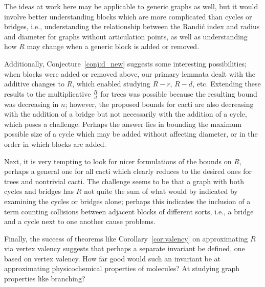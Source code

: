 \documentclass{amsart}
\theoremstyle{definition}
\begin{document}
The ideas at work here may be applicable to generic graphs as well, but it would involve better understanding blocks which are more complicated than cycles or bridges, i.e., understanding the relationship between the Randi\'c index and radius and diameter for graphs without articulation points, as well as understanding how $R$ may change when a generic block is added or removed. 

Additionally, Conjecture~\ref{conj:d_new} suggests some interesting possibilities; when blocks were added or removed above, our primary lemmata dealt with the additive changes to $R$, which enabled studying $R-r$, $R-d$, etc. Extending these results to the multiplicative $\frac{R}{d}$ for trees was possible because the resulting bound was decreasing in $n$; however, the proposed bounds for cacti are also decreasing with the addition of a bridge but not necessarily with the addition of a cycle, which poses a challenge. Perhaps the answer lies in bounding the maximum possible size of a cycle which may be added without affecting diameter, or in the order in which blocks are added.

Next, it is very tempting to look for nicer formulations of the bounds on $R$, perhaps a general one for all cacti which clearly reduces to the desired ones for trees and nontrivial cacti. The challenge seems to be that a graph with both cycles and bridges has $R$ not quite the sum of what would by indicated by examining the cycles or bridges alone; perhaps this indicates the inclusion of a term counting collisions between adjacent blocks of different sorts, i.e., a bridge and a cycle next to one another cause problems.

Finally, the success of theorems like Corollary~\ref{cor:valency} on approximating $R$ via vertex valency suggests that perhaps a separate invariant be defined, one based on vertex valency. How far good would such an invariant be at approximating physicochemical properties of molecules? At studying graph properties like branching?




\end{document}
